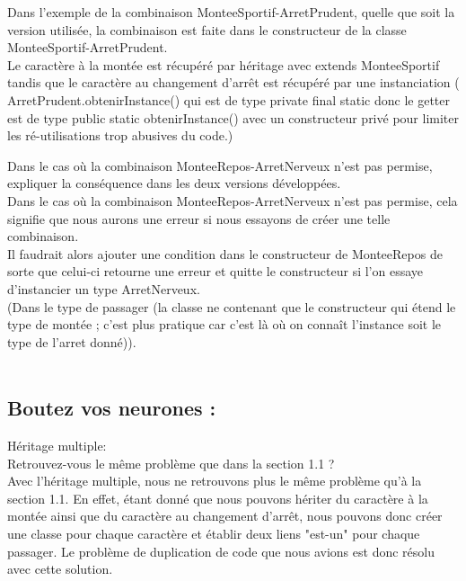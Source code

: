 \documentclass{article}
\begin{document}
Dans l’exemple de la combinaison MonteeSportif-ArretPrudent, quelle que soit la version utilisée, la combinaison est faite dans le constructeur de la classe MonteeSportif-ArretPrudent.\\
Le caractère à la montée est récupéré par héritage avec extends MonteeSportif tandis que le caractère au changement d’arrêt est récupéré par une instanciation ( ArretPrudent.obtenirInstance() qui est de type private final static donc le getter est de type public static obtenirInstance() avec un constructeur privé pour limiter les ré-utilisations trop abusives du code.)
\newline
\newline

Dans le cas où la combinaison MonteeRepos-ArretNerveux n’est pas permise, expliquer la conséquence dans les deux versions développées.\\

Dans le cas où la combinaison MonteeRepos-ArretNerveux n’est pas permise, cela signifie que nous aurons une erreur si nous essayons de créer une telle combinaison.\\
Il faudrait alors ajouter une condition dans le constructeur de MonteeRepos de sorte que celui-ci retourne une erreur et quitte le constructeur si l’on essaye d’instancier un type ArretNerveux.\\ (Dans le type de passager (la classe ne contenant que le constructeur qui étend le type de montée ; c'est plus pratique car c'est là où on connaît l'instance soit le type de l'arret donné)).\\ \\


\subsection{Boutez vos neurones : }



Héritage multiple:\\

Retrouvez-vous le même problème que dans la section 1.1 ?\\


Avec l’héritage multiple, nous ne retrouvons plus le même problème qu’à la section 1.1. En effet, étant donné que nous pouvons hériter du caractère à la montée ainsi que du caractère au changement d’arrêt, nous pouvons donc créer une classe pour chaque caractère et établir deux liens "est-un" pour chaque passager. Le problème de duplication de code que nous avions est donc résolu avec cette solution.\\
\end{document}
